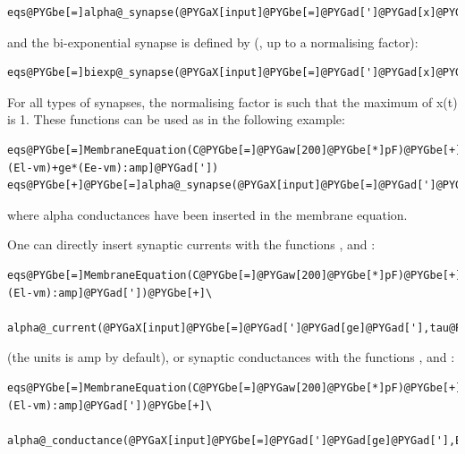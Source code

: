 \documentclass[letterpaper,10pt,english]{manual}
\begin{document}
\begin{Verbatim}[commandchars=@\[\]]
eqs@PYGbe[=]alpha@_synapse(@PYGaX[input]@PYGbe[=]@PYGad[']@PYGad[x]@PYGad['],tau@PYGbe[=]@PYGaw[10]@PYGbe[*]ms,unit@PYGbe[=]amp)
\end{Verbatim}

and the bi-exponential synapse is defined by (,
up to a normalising factor):

\begin{Verbatim}[commandchars=@\[\]]
eqs@PYGbe[=]biexp@_synapse(@PYGaX[input]@PYGbe[=]@PYGad[']@PYGad[x]@PYGad['],tau1@PYGbe[=]@PYGaw[10]@PYGbe[*]ms,tau2@PYGbe[=]@PYGaw[5]@PYGbe[*]ms,unit@PYGbe[=]amp)
\end{Verbatim}

For all types of synapses, the normalising factor is such that the maximum of x(t) is 1.
These functions can be used as in the following example:

\begin{Verbatim}[commandchars=@\[\]]
eqs@PYGbe[=]MembraneEquation(C@PYGbe[=]@PYGaw[200]@PYGbe[*]pF)@PYGbe[+]Current(@PYGad[']@PYGad[I=gl*(El-vm)+ge*(Ee-vm):amp]@PYGad['])
eqs@PYGbe[+]@PYGbe[=]alpha@_synapse(@PYGaX[input]@PYGbe[=]@PYGad[']@PYGad[ge@_in]@PYGad['],tau@PYGbe[=]@PYGaw[10]@PYGbe[*]ms,unit@PYGbe[=]siemens,output@PYGbe[=]@PYGad[']@PYGad[ge]@PYGad['])
\end{Verbatim}

where alpha conductances have been inserted in the membrane equation.

One can directly insert synaptic currents with the functions , 
and :

\begin{Verbatim}[commandchars=@\[\]]
eqs@PYGbe[=]MembraneEquation(C@PYGbe[=]@PYGaw[200]@PYGbe[*]pF)@PYGbe[+]Current(@PYGad[']@PYGad[I=gl*(El-vm):amp]@PYGad['])@PYGbe[+]\
    alpha@_current(@PYGaX[input]@PYGbe[=]@PYGad[']@PYGad[ge]@PYGad['],tau@PYGbe[=]@PYGaw[10]@PYGbe[*]ms)
\end{Verbatim}

(the units is amp by default), or synaptic conductances with the functions , 
and \code{biexp\_conductance}:

\begin{Verbatim}[commandchars=@\[\]]
eqs@PYGbe[=]MembraneEquation(C@PYGbe[=]@PYGaw[200]@PYGbe[*]pF)@PYGbe[+]Current(@PYGad[']@PYGad[I=gl*(El-vm):amp]@PYGad['])@PYGbe[+]\
    alpha@_conductance(@PYGaX[input]@PYGbe[=]@PYGad[']@PYGad[ge]@PYGad['],E@PYGbe[=]@PYGaw[0]@PYGbe[*]mV,tau@PYGbe[=]@PYGaw[10]@PYGbe[*]ms)
\end{Verbatim}
\end{document}
